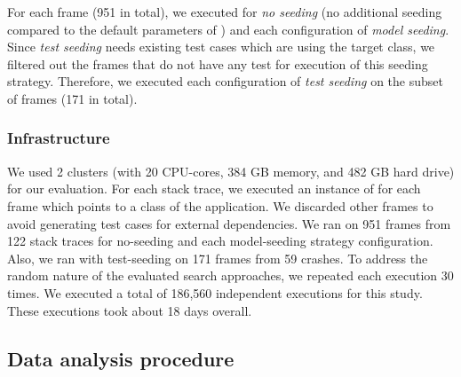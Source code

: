 For each frame (951 in total), we executed \botsing for \emph{no seeding} (\ie no additional seeding compared to the default parameters of \botsing) and each configuration of \emph{model seeding}. 
Since \emph{test seeding} needs existing test cases which are using the target class, we filtered out the frames that do not have any test for execution of this seeding strategy. Therefore, we executed each configuration of \emph{test seeding} on the subset of frames (171 in total). 


\subsubsection{Infrastructure}
\label{sec:setup:setup:infrst}
We used 2 clusters (with 20 CPU-cores, 384 GB memory, and 482 GB hard drive) for our evaluation. For each stack trace, we executed an instance of \botsing for each frame which points to a class of the application. We discarded other frames to avoid generating test cases for external dependencies. 
We ran \botsing on 951 frames from 122 stack traces for no-seeding and each model-seeding strategy configuration. Also, we ran \botsing with test-seeding on 171 frames from 59 crashes. To address the random nature of the evaluated search approaches, we repeated each execution 30 times.
We executed a total of 186,560 independent executions for this study. These executions took about 18 days overall.


\subsection{Data analysis procedure} 
\label{sec:setup:analyzing}

